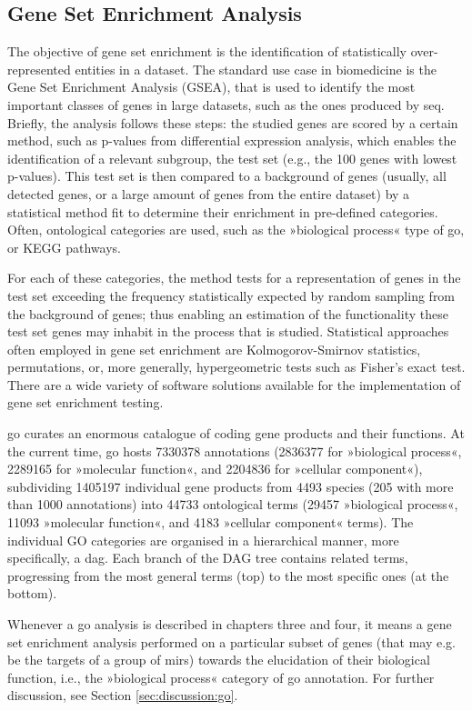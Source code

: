 \begin{method}
\subsection{Gene Set Enrichment Analysis} \label{sec:database:gsea}
The objective of gene set enrichment is the identification of statistically over-represented entities in a dataset. The standard use case in biomedicine is the Gene Set Enrichment Analysis (GSEA), that is used to identify the most important classes of genes in large datasets, such as the ones produced by \ac{seq}. Briefly, the analysis follows these steps: the studied genes are scored by a certain method, such as p-values from differential expression analysis, which enables the identification of a relevant subgroup, the test set (e.g., the 100 genes with lowest p-values). This test set is then compared to a background of genes (usually, all detected genes, or a large amount of genes from the entire dataset) by a statistical method fit to determine their enrichment in pre-defined categories. Often, ontological categories are used, such as the »biological process« type of \ac{go}, or KEGG pathways.

For each of these categories, the method tests for a representation of genes in the test set exceeding the frequency statistically expected by random sampling from the background of genes; thus enabling an estimation of the functionality these test set genes may inhabit in the process that is studied. Statistical approaches often employed in gene set enrichment are Kolmogorov-Smirnov statistics, permutations, or, more generally, hypergeometric tests such as Fisher's exact test. There are a wide variety of software solutions available for the implementation of gene set enrichment testing.

\acl{go} curates an enormous catalogue of coding gene products and their functions. At the current time, \ac{go} hosts \num{7330378} annotations (\num{2836377} for »biological process«, \num{2289165} for »molecular function«, and \num{2204836} for »cellular component«), subdividing \num{1405197} individual gene products from \num{4493} species (\num{205} with more than \num{1000} annotations) into \num{44733} ontological terms (\num{29457} »biological process«, \num{11093} »molecular function«, and \num{4183} »cellular component« terms). The individual GO categories are organised in a hierarchical manner, more specifically, a \ac{dag}. Each branch of the DAG tree contains related terms, progressing from the most general terms (top) to the most specific ones (at the bottom). 

Whenever a \ac{go} analysis is described in chapters three and four, it means a gene set enrichment analysis performed on a particular subset of genes (that may e.g. be the targets of a group of \acp{mir}) towards the elucidation of their biological function, i.e., the »biological process« category of \ac{go} annotation. For further discussion, see Section \ref{sec:discussion:go}.

\end{method}
